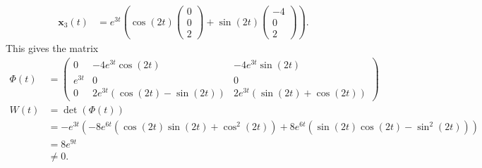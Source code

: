 \documentclass[10pt]{mypackage}
\begin{document}
\begin{example}
\begin{align*}
    \mathbf{x}_3(t) &= e^{3t} \left( \cos\left( 2t \right) \begin{pmatrix}0\\0\\2\end{pmatrix} + \sin\left( 2t \right) \begin{pmatrix}-4\\0\\2\end{pmatrix} \right).
  \end{align*}
  This gives the matrix
  \begin{align*}
    \Phi(t) &= \begin{pmatrix}0 & -4e^{3t}\cos\left( 2t \right) & -4e^{3t}\sin\left( 2t \right) \\ e^{3t} & 0 & 0 \\ 0 & 2e^{3t}\left( \cos\left( 2t \right) - \sin\left( 2t \right) \right) & 2e^{3t}\left( \sin\left( 2t \right) + \cos\left( 2t \right) \right)\end{pmatrix}\\
    W(t) &= \det\left( \Phi(t) \right)\\
         &= -e^{3t}\left( -8e^{6t}\left( \cos\left( 2t \right)\sin\left( 2t \right) + \cos^2\left( 2t \right) \right) + 8e^{6t}\left( \sin\left( 2t \right)\cos\left( 2t \right) - \sin^2\left( 2t \right) \right) \right)\\
         &= 8e^{9t}\\
         &\neq 0.
  \end{align*}
\end{example}
\end{document}
